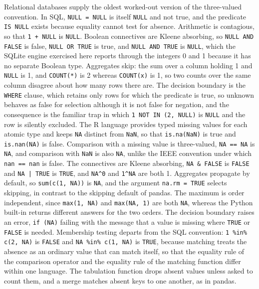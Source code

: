 \documentclass[11pt]{article}
\theoremstyle{remark}
\begin{document}
Relational databases supply the oldest worked-out version of the three-valued convention. In SQL, \verb|NULL = NULL| is itself \verb|NULL| and not true, and the predicate \verb|IS NULL| exists because equality cannot test for absence. Arithmetic is contagious, so that \verb|1 + NULL| is \verb|NULL|. Boolean connectives are Kleene absorbing, so \verb|NULL AND FALSE| is false, \verb|NULL OR TRUE| is true, and \verb|NULL AND TRUE| is \verb|NULL|, which the SQLite engine exercised here reports through the integers 0 and 1 because it has no separate Boolean type. Aggregates skip: the sum over a column holding 1 and \verb|NULL| is 1, and \verb|COUNT(*)| is 2 whereas \verb|COUNT(x)| is 1, so two counts over the same column disagree about how many rows there are. The decision boundary is the \verb|WHERE| clause, which retains only rows for which the predicate is true, so unknown behaves as false for selection although it is not false for negation, and the consequence is the familiar trap in which \verb|1 NOT IN (2, NULL)| is \verb|NULL| and the row is silently excluded. The R language provides typed missing values for each atomic type and keeps \verb|NA| distinct from \verb|NaN|, so that \verb|is.na(NaN)| is true and \verb|is.nan(NA)| is false. Comparison with a missing value is three-valued, \verb|NA == NA| is \verb|NA|, and comparison with \verb|NaN| is also \verb|NA|, unlike the IEEE convention under which \verb|nan == nan| is false. The connectives are Kleene absorbing, \verb|NA & FALSE| is \verb|FALSE| and \verb+NA | TRUE+ is \verb|TRUE|, and \verb|NA^0| and \verb|1^NA| are both 1. Aggregates propagate by default, so \verb|sum(c(1, NA))| is \verb|NA|, and the argument \verb|na.rm = TRUE| selects skipping, in contrast to the skipping default of pandas. The maximum is order independent, since \verb|max(1, NA)| and \verb|max(NA, 1)| are both \verb|NA|, whereas the Python built-in returns different answers for the two orders. The decision boundary raises an error, \verb|if (NA)| failing with the message that a value is missing where \verb|TRUE| or \verb|FALSE| is needed. Membership testing departs from the SQL convention: \verb|1 %in% c(2, NA)| is \verb|FALSE| and \verb|NA %in% c(1, NA)| is \verb|TRUE|, because matching treats the absence as an ordinary value that can match itself, so that the equality rule of the comparison operator and the equality rule of the matching function differ within one language. The tabulation function drops absent values unless asked to count them, and a merge matches absent keys to one another, as in pandas.
\end{document}
